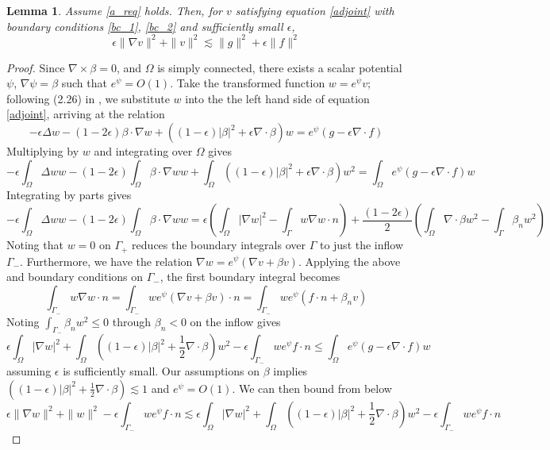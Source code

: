 \documentclass[11pt,onecolumn]{scrartcl}
\newcommand{\grad}{\nabla}
\newcommand{\curl}{\grad \times}
\renewcommand{\div}{\grad \cdot}
\newtheorem{lemma}{Lemma}
\begin{document}
\begin{lemma} 
\label{lemma_grad}
Assume \eqref{a_req} holds.  Then, for $v$ satisfying equation \eqref{adjoint} with boundary conditions \eqref{bc_1}, \eqref{bc_2} and sufficiently small $\epsilon$, 
\[
\epsilon \|\grad v\|^2 + \|v\|^2 \lesssim \|g\|^2 + \epsilon \| f\|^2
\]
\end{lemma}

\begin{proof}
Since $\curl \beta=0$, and $\Omega$ is simply connected, there exists a scalar potential $\psi$, $\grad \psi = \beta$ such that $e^\psi = O(1)$.  Take the transformed function $w = e^\psi v$; following (2.26) in \cite{DPGrobustness}, we substitute $w$ into the the left hand side of equation \eqref{adjoint}, arriving at the relation  
\[
-\epsilon \Delta w - (1-2\epsilon) \beta \cdot \grad w + \left((1-\epsilon)|\beta|^2 + \epsilon \div \beta\right) w = e^\psi (g-\epsilon \div f)
\]
Multiplying by $w$ and integrating over $\Omega$ gives
\[
-\epsilon \int_\Omega \Delta ww - (1-2\epsilon) \int_\Omega\beta \cdot \grad w w + \int_\Omega\left((1-\epsilon)|\beta|^2 + \epsilon \div \beta\right) w^2 = \int_\Omega e^\psi (g-\epsilon \div f) w
\]
Integrating by parts gives
\[
-\epsilon \int_\Omega \Delta ww - (1-2\epsilon) \int_\Omega\beta \cdot \grad w w = \epsilon \left( \int_\Omega |\grad w|^2- \int_{\Gamma} w \grad w \cdot n  \right) + \frac{(1-2\epsilon) }{2} \left(\int_\Omega \div \beta w^2 - \int_\Gamma\beta_n w^2 \right)
\]
Noting that $w=0$ on $\Gamma_+$ reduces the boundary integrals over $\Gamma$ to just the inflow $\Gamma_-$.  Furthermore, we have the relation $\grad w = e^\psi(\grad v + \beta v)$.  Applying the above and boundary conditions on $\Gamma_-$, the first boundary integral becomes
\[
\int_{\Gamma_-} w \grad w \cdot n = \int_{\Gamma_-} we^\psi(\grad v + \beta v)\cdot n =  \int_{\Gamma_-} we^\psi(f\cdot n + \beta_n v)
\]
Noting $\int_{\Gamma_-}\beta_n w^2 \leq 0$ through $\beta_n<0$ on the inflow gives
\[
\epsilon \int_\Omega |\grad w|^2 + \int_\Omega \left((1-\epsilon)|\beta|^2 + \frac{1}{2} \div \beta \right) w^2 - \epsilon \int_{\Gamma_-} we^\psi f\cdot n \leq \int_\Omega e^\psi (g-\epsilon \div f) w
\]
assuming $\epsilon$ is sufficiently small.  Our assumptions on $\beta$ implies $\left((1-\epsilon)|\beta|^2 + \frac{1}{2} \div \beta \right) \lesssim 1$ and $e^\psi = O(1)$. We can then bound from below
\[
\epsilon \|\grad w\|^2 + \|w\|^2 - \epsilon \int_{\Gamma_-} we^\psi f\cdot n  \lesssim \epsilon \int_\Omega |\grad w|^2 + \int_\Omega \left((1-\epsilon)|\beta|^2 + \frac{1}{2} \div \beta \right) w^2 - \epsilon \int_{\Gamma_-} we^\psi f\cdot n 
\]
\end{proof}
\end{document}
